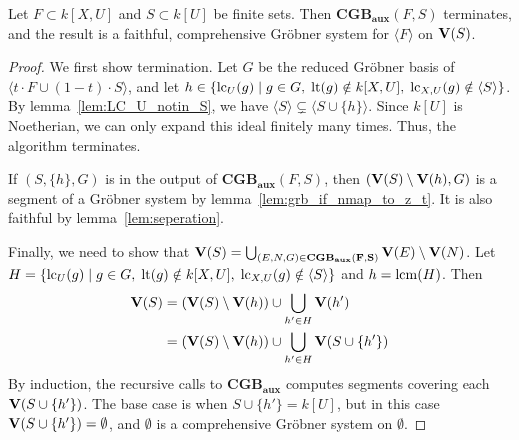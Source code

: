 \begin{algorithm}
  \caption{$\mathbf{CGB_{aux}}$}
\end{algorithm}
\begin{theorem}\label{thm:CGB_aux}
  Let $F \subset k[X, U]$ and $S \subset k[U]$ be finite sets. %
  Then $\mathbf{CGB_{aux}}(F, S)$ terminates, and the result is a faithful, comprehensive Gröbner system for $\langle F \rangle$ on $\operatorname{\mathbf V}(S)$.
\end{theorem}
\begin{proof}
  We first show termination. Let $G$ be the reduced Gröbner basis of $\langle t\cdot F \cup (1-t)\cdot S\rangle$, and let $h \in \{\operatorname{lc}_{U}(g) \mid g \in G,\; \operatorname{lt}(g) \notin k[X, U],\; \operatorname{lc}_{X, U}(g) \notin \langle S \rangle\}$. By lemma~\ref{lem:LC_U_notin_S}, we have $\langle S \rangle \subsetneq \langle S \cup \{h\} \rangle$. Since $k[U]$ is Noetherian, we can only expand this ideal finitely many times. Thus, the algorithm terminates.


  If $(S, \{h\}, G)$ is in the output of $\mathbf{CGB_{aux}}(F, S)$, then $(\operatorname{\mathbf V}(S) \setminus \operatorname{\mathbf V}(h), G)$ is a segment of a Gröbner system by lemma~\ref{lem:grb_if_nmap_to_z_t}. It is also faithful by lemma~\ref{lem:seperation}.

  Finally, we need to show that $\operatorname{\mathbf V}(S) = \bigcup_{(E, N, G) \in \mathbf{CGB_{aux}(F, S)}} \operatorname{\mathbf V}(E) \setminus \operatorname{\mathbf V}(N)$. Let $H = \{\operatorname{lc}_{U}(g) \mid g \in G,\; \operatorname{lt}(g) \notin k[X, U],\; \operatorname{lc}_{X, U}(g) \notin \langle S \rangle \}$ and $h = \operatorname{lcm}(H)$. Then
  \begin{align*}
    \operatorname{\mathbf V}(S) &= (\operatorname{\mathbf V}(S) \setminus \operatorname{\mathbf V}(h)) \cup \bigcup_{h' \in H} \operatorname{\mathbf V}(h') \\
    &= (\operatorname{\mathbf V}(S) \setminus \operatorname{\mathbf V}(h)) \cup \bigcup_{h' \in H} \operatorname{\mathbf V}(S \cup \{h'\})
  \end{align*}
  By induction, the recursive calls to $\mathbf{CGB_{aux}}$ computes segments covering each $\operatorname{\mathbf V}(S \cup \{h'\})$. The base case is when $S \cup \{h'\} = k[U]$, but in this case $\operatorname{\mathbf V}(S \cup \{h'\}) = \emptyset$, and $\emptyset$ is a comprehensive Gröbner system on $\emptyset$.
\end{proof}

